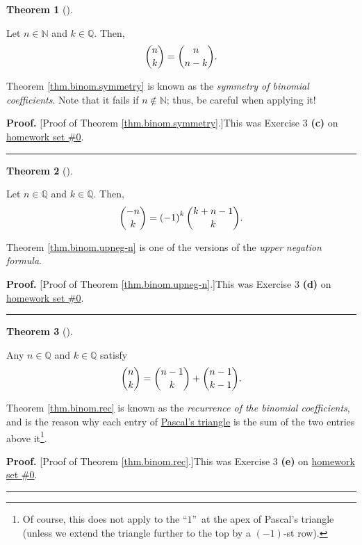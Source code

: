 \documentclass[numbers=enddot,12pt,final,onecolumn,notitlepage]{scrartcl}%
\numberwithin{exer}{subsection}
\theoremstyle{definition}
\newtheorem{theo}{Theorem}[subsection]
\newenvironment{theorem}[1][]
{\begin{theo}[#1]\begin{leftbar}}
{\end{leftbar}\end{theo}}
\newenvironment{proof}[1][Proof]{\noindent\textbf{#1.} }{\ \rule{0.5em}{0.5em}}
\begin{document}
\begin{theorem}
\label{thm.binom.symmetry}Let $n\in\mathbb{N}$ and $k\in\mathbb{Q}$. Then,%
\[
\dbinom{n}{k}=\dbinom{n}{n-k}.
\]

\end{theorem}

Theorem \ref{thm.binom.symmetry} is known as the \textit{symmetry of binomial
coefficients}. Note that it fails if $n\notin\mathbb{N}$; thus, be careful
when applying it!

\begin{proof}
[Proof of Theorem \ref{thm.binom.symmetry}.]This was Exercise 3 \textbf{(c)}
on \href{http://www-users.math.umn.edu/~dgrinber/19s/hw0s.pdf}{homework set
\#0}.
\end{proof}

\begin{theorem}
\label{thm.binom.upneg-n}Let $n\in\mathbb{Q}$ and $k\in\mathbb{Q}$. Then,%
\[
\dbinom{-n}{k}=\left(  -1\right)  ^{k}\dbinom{k+n-1}{k}.
\]

\end{theorem}

Theorem \ref{thm.binom.upneg-n} is one of the versions of the \textit{upper
negation formula}.

\begin{proof}
[Proof of Theorem \ref{thm.binom.upneg-n}.]This was Exercise 3 \textbf{(d)} on
\href{http://www-users.math.umn.edu/~dgrinber/19s/hw0s.pdf}{homework set \#0}.
\end{proof}

\begin{theorem}
\label{thm.binom.rec}Any $n\in\mathbb{Q}$ and $k\in\mathbb{Q}$ satisfy
\[
\dbinom{n}{k}=\dbinom{n-1}{k}+\dbinom{n-1}{k-1}.
\]

\end{theorem}

Theorem \ref{thm.binom.rec} is known as the \textit{recurrence of the binomial
coefficients}, and is the reason why each entry of
\href{https://en.wikipedia.org/wiki/Pascal%27s_triangle}{Pascal's triangle} is
the sum of the two entries above it\footnote{Of course, this does not apply to
the \textquotedblleft$1$\textquotedblright\ at the apex of Pascal's triangle
(unless we extend the triangle further to the top by a $\left(  -1\right)
$-st row).}.

\begin{proof}
[Proof of Theorem \ref{thm.binom.rec}.]This was Exercise 3 \textbf{(e)} on
\href{http://www-users.math.umn.edu/~dgrinber/19s/hw0s.pdf}{homework set \#0}.
\end{proof}
\end{document}

